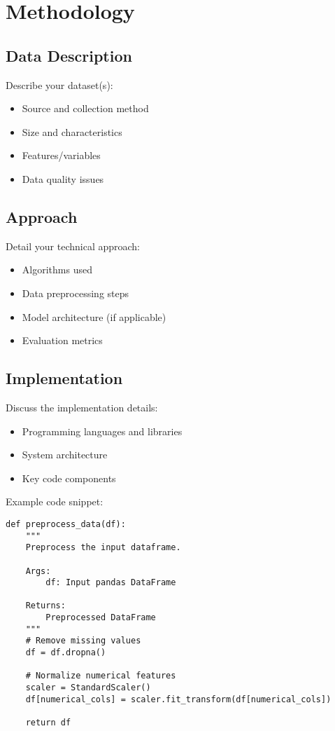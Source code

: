 \documentclass[11pt,a4paper]{article}
\begin{document}
\section{Methodology}
\label{sec:methodology}

\subsection{Data Description}
Describe your dataset(s):
\begin{itemize}
    \item Source and collection method
    \item Size and characteristics
    \item Features/variables
    \item Data quality issues
\end{itemize}

\subsection{Approach}
Detail your technical approach:
\begin{itemize}
    \item Algorithms used
    \item Data preprocessing steps
    \item Model architecture (if applicable)
    \item Evaluation metrics
\end{itemize}

\subsection{Implementation}
Discuss the implementation details:
\begin{itemize}
    \item Programming languages and libraries
    \item System architecture
    \item Key code components
\end{itemize}

Example code snippet:
\begin{lstlisting}[caption={Example data preprocessing function}]
def preprocess_data(df):
    """
    Preprocess the input dataframe.
    
    Args:
        df: Input pandas DataFrame
    
    Returns:
        Preprocessed DataFrame
    """
    # Remove missing values
    df = df.dropna()
    
    # Normalize numerical features
    scaler = StandardScaler()
    df[numerical_cols] = scaler.fit_transform(df[numerical_cols])
    
    return df
\end{lstlisting}
\end{document}

